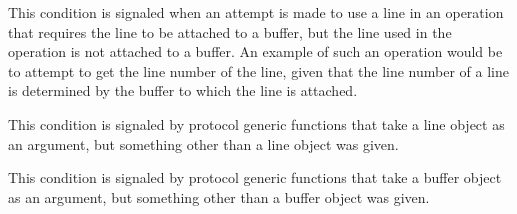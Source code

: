 
This condition is signaled when an attempt is made to use a line
in an operation that requires the line to be attached to a buffer,
but the line used in the operation is not attached to a buffer.
An example of such an operation would be to attempt to get the
line number of the line, given that the line number of a line is
determined by the buffer to which the line is attached.


This condition is signaled by protocol generic functions that take
a line object as an argument, but something other than a line
object was given.


This condition is signaled by protocol generic functions that take
a buffer object as an argument, but something other than a buffer
object was given.
